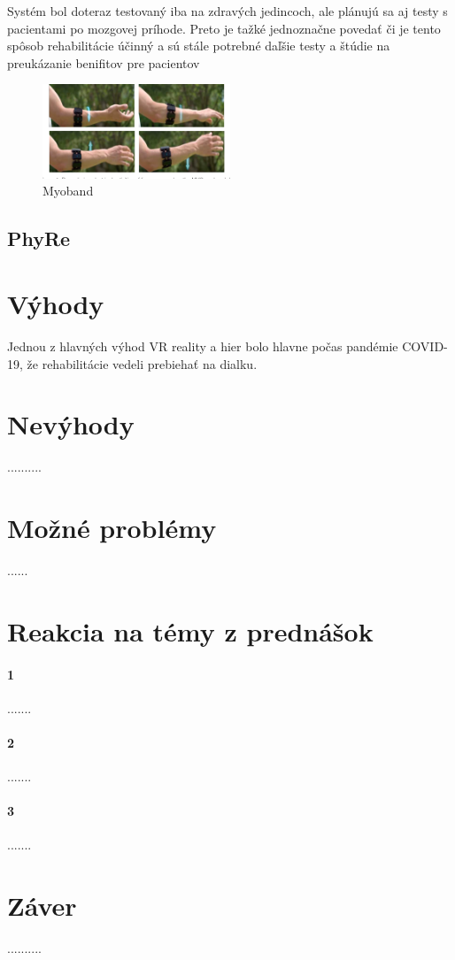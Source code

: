 \documentclass[10pt,twoside,slovak,a4paper]{article}
\begin{document}
Systém bol doteraz testovaný iba na zdravých jedincoch, ale plánujú sa aj testy s pacientami po mozgovej príhode. Preto je tažké jednoznačne povedať či je tento spôsob rehabilitácie účinný a  sú stále potrebné daľšie testy a štúdie na preukázanie benifitov pre pacientov\cite{7088817}

\begin{figure}
    \centering
    \includegraphics[width = 0.5\textwidth]{obrazky/Myoband.png}
    \caption{Myoband}
    \label{fig:Myoband pohyby}
\end{figure}

\subsection{PhyRe}\cite{9564051}

\section{Výhody} 
Jednou z hlavných výhod VR reality a hier bolo hlavne počas pandémie COVID-19, že rehabilitácie vedeli prebiehať na dialku.



\section{Nevýhody}
..........\cite{7523762}


\section{Možné problémy}
......

\section{Reakcia na témy z prednášok}
\paragraph{1}

.......
\paragraph{2}


.......
\paragraph{3}

.......



\section{Záver} 
..........







\end{document}
